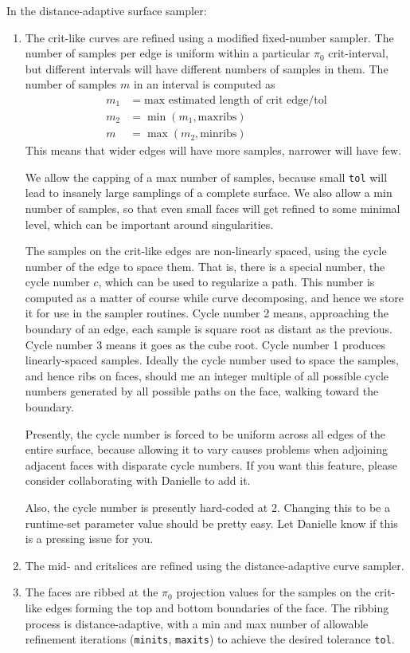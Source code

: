 In the distance-adaptive surface sampler:
\begin{enumerate}
\item The crit-like curves are refined using a modified fixed-number sampler.  The number of samples per edge is uniform within a particular $\pi_0$ crit-interval, but different intervals will have different numbers of samples in them.  The number of samples $m$ in an interval is computed as
\begin{align*}
m_1 &= \text{max estimated length of crit edge} / \text{tol} \\
m_2 &= \min(m_1, \text{maxribs}) \\
m &= \max(m_2, \text{minribs})
\end{align*}
This means that wider edges will have more samples, narrower will have few.

We allow the capping of a max number of samples, because small {\tt tol} will lead to insanely large samplings of a complete surface.  We also allow a min number of samples, so that even small faces will get refined to some minimal level, which can be important around singularities.

The samples on the crit-like edges are non-linearly spaced, using the cycle number of the edge to space them.  That is, there is a special number, the cycle number $c$, which can be used to regularize a path.  This number is computed as a matter of course while curve decomposing, and hence we store it for use in the sampler routines.  Cycle number 2 means, approaching the boundary of an edge, each sample is square root as distant as the previous.  Cycle number 3 means it goes as the cube root.  Cycle number 1 produces linearly-spaced samples.  Ideally the cycle number used to space the samples, and hence ribs on faces, should me an integer multiple of all possible cycle numbers generated by all possible paths on the face, walking toward the boundary.

Presently, the cycle number is forced to be uniform across all edges of the entire surface, because allowing it to vary causes problems when adjoining adjacent faces with disparate cycle numbers.  If you want this feature, please consider collaborating with Danielle to add it.

Also, the cycle number is presently hard-coded at 2.  Changing this to be a runtime-set parameter value should be pretty easy.  Let Danielle know if this is a pressing issue for you.



\item  The mid- and critslices are refined using the distance-adaptive curve sampler.

\item The faces are ribbed at the $\pi_0$ projection values for the samples on the crit-like edges forming the top and bottom boundaries of the face.  The ribbing process is distance-adaptive, with a min and max number of allowable refinement iterations ({\tt minits}, {\tt maxits}) to achieve the desired tolerance {\tt tol}.
\end{enumerate}


